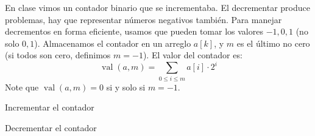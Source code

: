 \documentclass[english, spanish, fleqn]{article}
\title{Algoritmos y Complejidad\\
       Tarea \#\num \\
       ``Amortizando\ldots''}
\author{Algorithm Knaves}
\date{26 de noviembre de 2018}
\begin{document}
\maketitle
\thispagestyle{empty}

  En clase vimos un contador binario que se incrementaba.
  El decrementar produce problemas,
  hay que representar números negativos también.
  Para manejar decrementos en forma eficiente,
  usamos  que pueden tomar los valores \(-1, 0, 1\)
  (no solo \(0, 1\)).
  Almacenamos el contador en un arreglo \(a[k]\),
  y \(m\) es el último  no cero
  (si todos son cero, definimos \(m = -1\)).
  El valor del contador es:
  \begin{equation*}
    \operatorname{val}(a, m)
      = \sum_{0 \le i \le m} a[i] \cdot 2^i
  \end{equation*}
  Note que \(\operatorname{val}(a, m) = 0\) si y solo si \(m = -1\).
  \IncMargin{3em}%
  \begin{algorithm}[ht]
    \DontPrintSemicolon

    \caption{Incrementar el contador}
    \label{alg:counter-inc}
  \end{algorithm}%
  \DecMargin{3em}
  \IncMargin{3em}%
  \begin{algorithm}[ht]
    \DontPrintSemicolon

    \caption{Decrementar el contador}
    \label{alg:counter-dec}
  \end{algorithm}%
  \DecMargin{3em}
\end{document}
